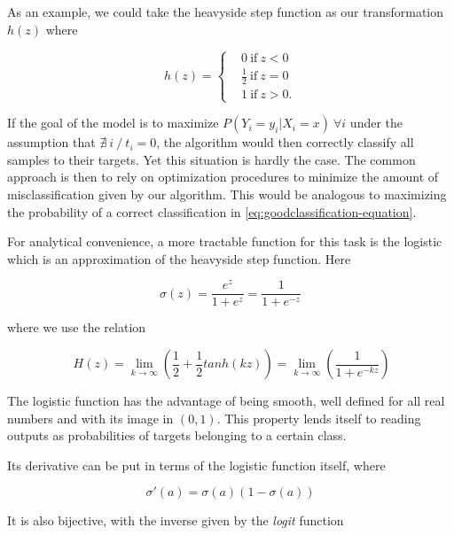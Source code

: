 As an example, we could take the heavyside step function as our transformation $h(z)$ where

\begin{equation}
h(z) =
\begin{cases}
&0 \ \mbox{if} \ z<0 \\
&\frac{1}{2} \ \mbox{if} \ z=0 \\
&1 \ \mbox{if} \ z>0.
\end{cases}
\end{equation}

If the goal of the model is to maximize $P(Y_i = y_i | X_i = x) \ \forall i$
under the assumption that $\nexists\ i \ / \ t_i = 0$, the algorithm would then correctly classify all samples to their targets. Yet this situation is hardly the case. The common approach is then to rely on optimization procedures to minimize the amount of misclassification given by our algorithm. This would be analogous to maximizing the probability of a correct classification in \cref{eq:goodclassification-equation}.

For analytical convenience, a more tractable function for this task is the logistic which is an approximation of the heavyside step function. Here

\begin{equation} \label{eq:logisticFunction}
\sigma(z) = \frac{e^{z}}{1 + e^{z}} = \frac{1}{1 + e^{-z}}
\end{equation}

where we use the relation

\begin{equation}
 \ H(z) = \lim_{k \to \infty} \left(\frac{1}{2} + \frac{1}{2}tanh(kz) \right) = \lim_{k \to \infty} \left(\frac{1}{1+e^{-kz}} \right)
\end{equation}

The logistic function has the advantage of being smooth, well defined for all real numbers and with its image in $(0,1)$. This property lends itself to reading outputs as probabilities of targets belonging to a certain class.

 Its derivative can be put in terms of the logistic function itself, where

\begin{equation} \label{eq:derivativeLogisticFunction}
\sigma '(a) = \sigma(a)( 1 - \sigma(a) )
\end{equation}

It is also bijective, with the inverse given by the \textit{logit} function

